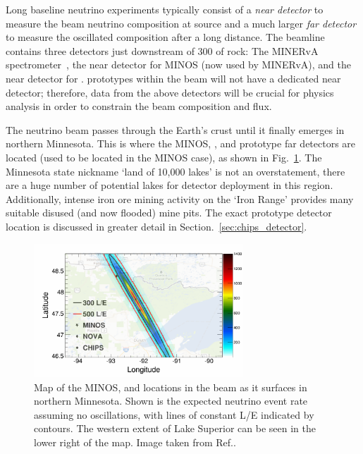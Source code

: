 Long baseline neutrino experiments typically consist of a \emph{near detector} to measure the beam
neutrino composition at source and a much larger \emph{far detector} to measure the oscillated
composition after a long distance. The \numi beamline contains three detectors just downstream of
\unit{300}{} of rock: The MINERvA spectrometer~\cite{mcfarland2006}, the near detector
for MINOS (now used by MINERvA), and the near detector for \nova. \chips prototypes within the
\numi beam will not have a dedicated near detector; therefore, data from the above detectors will
be crucial for physics analysis in order to constrain the beam composition and flux.

The \numi neutrino beam passes through the Earth's crust until it finally emerges in northern
Minnesota. This is where the MINOS, \nova, and prototype \chips far detectors are located (used to
be located in the MINOS case), as shown in Fig.~\ref{fig:numi_map}. The Minnesota state nickname
`land of 10,000 lakes' is not an overstatement, there are a huge number of potential lakes for
\chips detector deployment in this region. Additionally, intense iron ore mining activity on the
`Iron Range' provides many suitable disused (and now flooded) mine pits. The exact \chipsfive
prototype detector location is discussed in greater detail in Section.~\ref{sec:chips_detector}.

\begin{figure} %
    \includegraphics[width=0.7\textwidth]{diagrams/4-chips/numi_map.png}
    \caption[Map of detector locations in the \numi beam.]
    {Map of the MINOS, \nova and \chips locations in the \numi beam as it surfaces in northern
        Minnesota. Shown is the expected neutrino event rate assuming no oscillations, with lines
        of constant L/E indicated by contours. The western extent of Lake Superior can be seen in
        the lower right of the map. Image taken from Ref.\cite{adamson2013}.}
    \label{fig:numi_map}
\end{figure}

